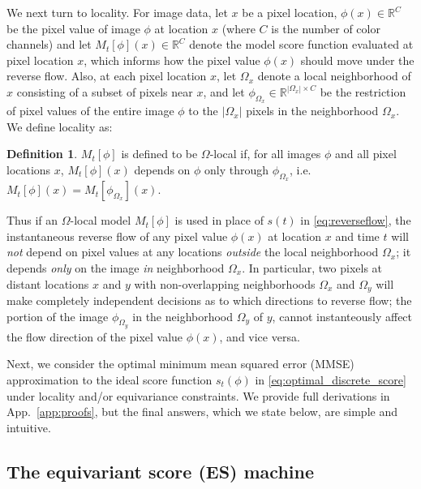 \documentclass{article}
\theoremstyle{plain}
\theoremstyle{definition}
\newtheorem{definition}[theorem]{Definition}
\theoremstyle{remark}
\begin{document}
We next turn to locality. For image data, let $x$ be a pixel location, $\phi(x) \in \mathbb{R}^C$ be the pixel value of image $\phi$ at location $x$ (where $C$ is the number of color channels) and let $M_t[\phi](x) \in \mathbb{R}^C$ denote the model score function evaluated at pixel location $x$, which informs how the pixel value $\phi(x)$ should move under the reverse flow.  Also, at each pixel location $x$, let $\Omega_x$ denote a local neighborhood of $x$ consisting of a subset of pixels near $x$, and let $\phi_{\Omega_x} \in \mathbb{R}^{|\Omega_x|\times C}$ be the restriction of pixel values of the entire image $\phi$ to the $|\Omega_x|$ pixels in the neighborhood $\Omega_x$. We define locality as:
\begin{definition}
$M_t[\phi]$ is defined to be $\Omega$-local if, for all images $\phi$ and all pixel locations $x$, $M_t[\phi](x)$ depends on $\phi$ only through $\phi_{\Omega_x}$, i.e. $M_t[\phi](x) = M_t[\phi_{\Omega_x}](x)$. 
\end{definition}
Thus if an $\Omega$-local model $M_t[\phi]$ is used in place of $s(t)$ in \eqref{eq:reverseflow}, the instantaneous reverse flow of any pixel value $\phi(x)$ at location $x$ and time $t$ will {\it not} depend on pixel values at any locations {\it outside} the local neighborhood $\Omega_x$; it depends {\it only} on the image {\it in} neighborhood $\Omega_x$.  In particular, two pixels at distant locations $x$ and $y$ with non-overlapping neighborhoods $\Omega_x$ and $\Omega_y$ will make completely independent decisions as to which directions to reverse flow; the portion of the image $\phi_{\Omega_y}$ in the neighborhood $\Omega_y$ of $y$, cannot instanteously affect the flow direction of the pixel value $\phi(x)$, and vice versa.  

Next, we consider the optimal minimum mean squared error (MMSE) approximation to the ideal score function $s_t(\phi)$ in \eqref{eq:optimal_discrete_score} under locality and/or equivariance constraints. We provide full derivations in App.~\ref{app:proofs}, but the final answers, which we state below, are simple and intuitive. 



\subsection{The equivariant score (ES) machine}
\end{document}
